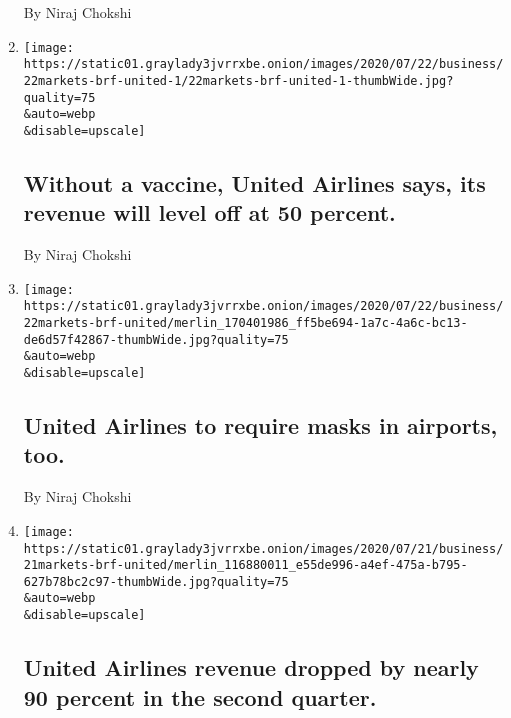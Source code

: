 \begin{enumerate}
  By Niraj Chokshi
\item
  \href{/2020/07/22/business/without-a-vaccine-united-airlines-says-its-revenue-will-level-off-at-50-percent.html}{}

  \texttt{[image: https://static01.graylady3jvrrxbe.onion/images/2020/07/22/business/22markets-brf-united-1/22markets-brf-united-1-thumbWide.jpg?quality=75\\\&auto=webp\\\&disable=upscale]}

  \hypertarget{without-a-vaccine-united-airlines-says-its-revenue-will-level-off-at-50-percent}{%
  \subsection{Without a vaccine, United Airlines says, its revenue will
  level off at 50
  percent.}\label{without-a-vaccine-united-airlines-says-its-revenue-will-level-off-at-50-percent}}

  By Niraj Chokshi
\item
  \href{/2020/07/22/business/united-airlines-to-require-masks-in-airports-too.html}{}

  \texttt{[image: https://static01.graylady3jvrrxbe.onion/images/2020/07/22/business/22markets-brf-united/merlin\_170401986\_ff5be694-1a7c-4a6c-bc13-de6d57f42867-thumbWide.jpg?quality=75\\\&auto=webp\\\&disable=upscale]}

  \hypertarget{united-airlines-to-require-masks-in-airports-too}{%
  \subsection{United Airlines to require masks in airports,
  too.}\label{united-airlines-to-require-masks-in-airports-too}}

  By Niraj Chokshi
\item
  \href{/live/2020/07/21/business/stock-market-today-coronavirus/united-earnings}{}

  \texttt{[image: https://static01.graylady3jvrrxbe.onion/images/2020/07/21/business/21markets-brf-united/merlin\_116880011\_e55de996-a4ef-475a-b795-627b78bc2c97-thumbWide.jpg?quality=75\\\&auto=webp\\\&disable=upscale]}

  \hypertarget{united-airlines-revenue-dropped-by-nearly-90-percent-in-the-second-quarter}{%
  \subsection{United Airlines revenue dropped by nearly 90 percent in
  the second
  quarter.}\label{united-airlines-revenue-dropped-by-nearly-90-percent-in-the-second-quarter}}


\end{enumerate}
